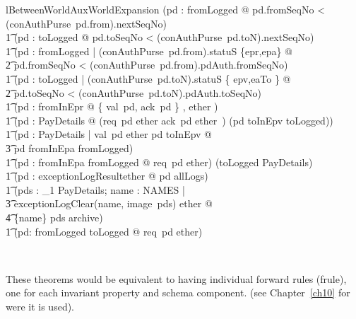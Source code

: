 \begin{LNewLemma}
\begin{theorem}{lBetweenWorldAuxWorldExpansion}
            (\forall pd : fromLogged @  pd.fromSeqNo < (conAuthPurse~pd.from).nextSeqNo) \land \\ \t1
            (\forall pd : toLogged @ pd.toSeqNo < (conAuthPurse~pd.toN).nextSeqNo) \land  \\ \t1
            (\forall pd : fromLogged | (conAuthPurse~pd.from).statuS \in \{epr,epa\} @  \\ %
                \t2 pd.fromSeqNo < (conAuthPurse~pd.from).pdAuth.fromSeqNo) \land \\ \t1
            (\forall pd : toLogged | (conAuthPurse~pd.toN).statuS \in \{ epv,eaTo \} @ \\ %
                \t2 pd.toSeqNo < (conAuthPurse~pd.toN).pdAuth.toSeqNo) \land \\ \t1
            (\forall pd : fromInEpr @ \disjoint \langle \{ val~pd, ack~pd \} , ether \rangle) \land \\ \t1
            (\forall pd : PayDetails @ (req~pd \in ether \land ack~pd \notin ether~)
                \iff (pd \in toInEpv \cup toLogged)) \\ \t1
            \land (\forall pd : PayDetails | val~pd \in ether \land pd \in toInEpv @ \\ %
                \t3 pd \in fromInEpa \cup fromLogged) \land \\ \t1
            (\forall pd : fromInEpa \cup fromLogged @  req~pd \in ether) \land
            (toLogged \in \finset PayDetails) \land \\ \t1
            (\forall pd : exceptionLogResult\inv \limg ether \rimg @ pd \in allLogs) \land \\ \t1
            (\forall pds : \power_1 PayDetails; name : NAMES | \\ %
                    \t3 exceptionLogClear(name, image~pds) \in ether @ \\ %
                \t4 \{name\} \cross pds \subseteq archive) \land \\ \t1
            (\forall pd: fromLogged \cup toLogged @ req~pd \in ether)
\end{theorem}~\end{LNewLemma}
%
These theorems would be equivalent to having individual forward rules (frule),
one for each invariant property and schema component. (see Chapter~\ref{ch10} for
were it is used).
%
